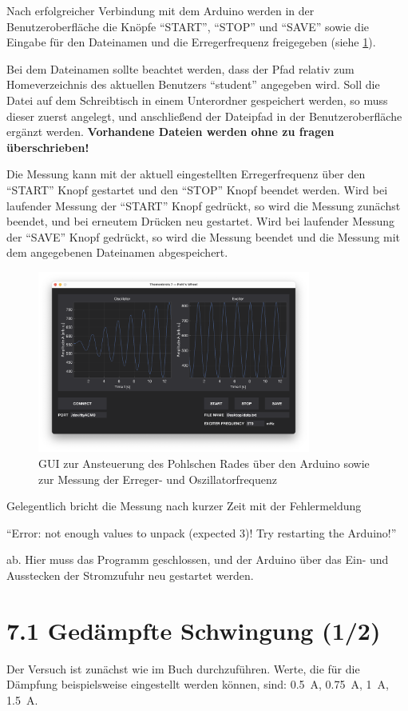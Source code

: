 \documentclass[ngerman,a4paper,11pt]{article}
\begin{document}
Nach erfolgreicher Verbindung mit dem Arduino werden in der Benutzeroberfläche die Knöpfe \enquote{START}, \enquote{STOP} und \enquote{SAVE} sowie die Eingabe für den Dateinamen und die Erregerfrequenz freigegeben (siehe \cref{fig:gui}).

Bei dem Dateinamen sollte beachtet werden, dass der Pfad relativ zum Homeverzeichnis des aktuellen Benutzers \enquote{student} angegeben wird. Soll die Datei auf dem Schreibtisch in einem Unterordner gespeichert werden, so muss dieser zuerst angelegt, und anschließend der Dateipfad in der Benutzeroberfläche ergänzt werden. \textbf{Vorhandene Dateien werden ohne zu fragen überschrieben!}

Die Messung kann mit der aktuell eingestellten Erregerfrequenz über den \enquote{START} Knopf gestartet und den \enquote{STOP} Knopf beendet werden. Wird bei laufender Messung der \enquote{START} Knopf gedrückt, so wird die Messung zunächst beendet, und bei erneutem Drücken neu gestartet. Wird bei laufender Messung der \enquote{SAVE} Knopf gedrückt, so wird die Messung beendet und die Messung mit dem angegebenen Dateinamen abgespeichert.
\begin{figure}[H]
  \centering
  \includegraphics[width=0.8\textwidth]{screenshot-gui.png}
  \caption{GUI zur Ansteuerung des Pohlschen Rades über den Arduino sowie zur Messung der Erreger- und Oszillatorfrequenz}
  \label{fig:gui}
\end{figure}
Gelegentlich bricht die Messung nach kurzer Zeit mit der Fehlermeldung

\hspace{1em} \enquote{Error: not enough values to unpack (expected 3)! Try restarting the Arduino!}

ab. Hier muss das Programm geschlossen, und der Arduino über das Ein- und Ausstecken der Stromzufuhr neu gestartet werden.
\section*{7.1 Gedämpfte Schwingung (1/2)}
Der Versuch ist zunächst wie im Buch durchzuführen. Werte, die für die Dämpfung beispielsweise eingestellt werden können, sind: \SI{0.5}{\ampere}, \SI{0.75}{\ampere}, \SI{1}{\ampere}, \SI{1.5}{\ampere}.
\end{document}
